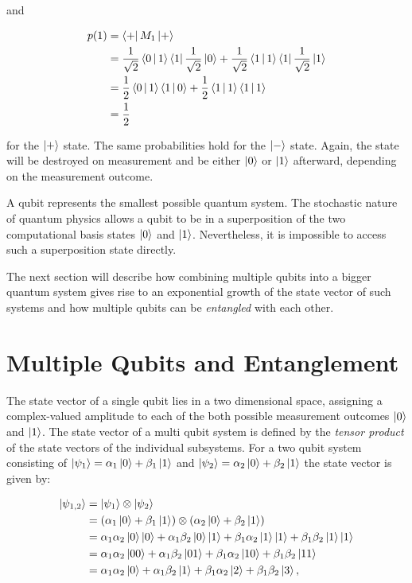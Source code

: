 and

\begin{align}
  p(1) &= \Bra{+} M_1 \Ket{+} \\
       &= \frac{1}{\sqrt{2}} \Braket{0|1} \Bra{1} \frac{1}{\sqrt{2}} \Ket{0} + \frac{1}{\sqrt{2}} \Braket{1|1} \Bra{1} \frac{1}{\sqrt{2}} \Ket{1} \\
       &= \frac{1}{2} \Braket{0|1} \Braket{1|0} + \frac{1}{2} \Braket{1|1} \Braket{1|1} \\
       &= \frac{1}{2}
\end{align}



for the $\Ket{+}$ state. The same probabilities hold for the
$\Ket{-}$ state.
Again, the state will be destroyed on measurement and be either $\Ket{0}$ or $\Ket{1}$ afterward, depending on the measurement outcome.

A qubit represents the smallest possible quantum system. The stochastic nature of quantum physics allows a qubit to be in a superposition of the
two computational basis states $\Ket{0}$ and $\Ket{1}$. 
Nevertheless, it is impossible to access such a superposition state directly.

The next section will describe how combining multiple qubits into a bigger
quantum system gives rise to an exponential growth of the state vector of such systems and how multiple qubits can be \textit{entangled}
with each other.

\section{Multiple Qubits and Entanglement}

The state vector of a single qubit lies in a two dimensional 
space, assigning a complex-valued amplitude to each of the both possible measurement outcomes
$\Ket{0}$ and $\Ket{1}$. The state vector of a multi qubit system is defined by
the \textit{tensor product} of the state vectors of the individual subsystems.
For a two qubit system consisting of $\Ket{\psi_1} = \alpha_1 \Ket{0} + \beta_1
\Ket{1}$ and $\Ket{\psi_2} = \alpha_2 \Ket{0} + \beta_2 \Ket{1}$ the state vector
is given by:

\begin{align}
  \Ket{\psi_{1,2}} &= \Ket{\psi_1} \otimes \Ket{\psi_2} \\
                   &= (\alpha_1 \Ket{0} + \beta_1 \Ket{1}) \otimes (\alpha_2 \Ket{0} + \beta_2 \Ket{1}) \\
                   &= \alpha_1 \alpha_2 \Ket{0}\Ket{0} + \alpha_1 \beta_2 \Ket{0} \Ket{1} + \beta_1 \alpha_2 \Ket{1} \Ket{1} + \beta_1 \beta_2 \Ket{1} \Ket{1} \\
                   &= \alpha_1 \alpha_2 \Ket{00} + \alpha_1 \beta_2 \Ket{01} + \beta_1 \alpha_2 \Ket{10} + \beta_1 \beta_2 \Ket{11} \\
                   &= \alpha_1 \alpha_2 \Ket{0} + \alpha_1 \beta_2 \Ket{1} + \beta_1 \alpha_2 \Ket{2} + \beta_1 \beta_2 \Ket{3},
\end{align}

